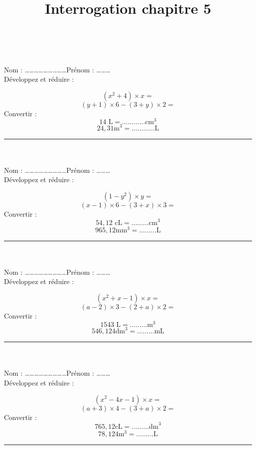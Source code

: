 \documentclass[14 pt]{extarticle}
\title{Interrogation chapitre 5}
\date{}
\theoremstyle{plain}
\begin{document}
 \ \\ \ \\
 Nom : \ldots\ldots\ldots\ldots\ldots\ldots\ldots\ldots\ldots Prénom : \ldots\ldots\ldots \\ 
Développez et réduire :

 \[ (x^2 + 4) \times x = \]
 \[ (y+1)\times 6 - (3 + y) \times 2 = \]
 Convertir : 
 \[ 14 \text{ L} = \ldots\ldots\ldots\ldots \text{cm}^3\]
 \[ 24,31 \text{m}^3 = \ldots\ldots\ldots\ldots \text{L}\]
 
 \hrule
 \ \\ \ \\
 Nom : \ldots\ldots\ldots\ldots\ldots\ldots\ldots\ldots\ldots Prénom : \ldots\ldots\ldots \\ 
Développez et réduire :

 \[ (1 - y^2) \times y = \]
 \[ (x-1)\times 6 - (3 + x) \times 3 = \]
 Convertir : 
 \[ 54,12 \text{ cL} = \ldots\ldots\ldots \text{cm}^3\]
 \[ 965,12\text{mm}^3 = \ldots\ldots\ldots \text{L}\]
 
 \hrule
 \ \\ \ \\
 Nom : \ldots\ldots\ldots\ldots\ldots\ldots\ldots\ldots\ldots Prénom : \ldots\ldots\ldots \\ 
Développez et réduire :

 \[ (x^2 + x - 1) \times x = \]
 \[ (a-2)\times 3 - (2 +a) \times 2  = \]
 Convertir : 
 \[ 1543 \text{ L} = \ldots\ldots\ldots \text{m}^3\]
 \[ 546,124 \text{dm}^3 = \ldots\ldots\ldots \text{mL}\]
 
 \hrule
 \ \\ \ \\
 Nom : \ldots\ldots\ldots\ldots\ldots\ldots\ldots\ldots\ldots Prénom : \ldots\ldots\ldots \\ 
Développez et réduire :

 \[ (x^2 - 4x - 1) \times x = \]
 \[ (a+3)\times 4 - (3 + a) \times 2 = \]
 Convertir : 
 \[ 765,12 \text{cL} = \ldots\ldots\ldots \text{dm}^3\]
 \[ 78,124 \text{m}^3 = \ldots\ldots\ldots \text{L}\]
 
 \hrule
 
 
 
 	
\end{document}

